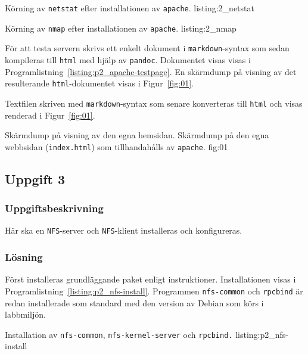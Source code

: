             {Körning av \texttt{netstat} efter installationen av \texttt{apache}.}
            {listing:2_netstat}

            {Körning av \texttt{nmap} efter installationen av \texttt{apache}.}
            {listing:2_nmap}


För att testa servern skrivs ett enkelt dokument i
\texttt{markdown}\cite{Gruber2013}-syntax som sedan kompileras till
\texttt{html} med hjälp av \texttt{pandoc}\cite{MacFarlane2013}.
Dokumentet visas visas i Programlistning~\ref{listing:p2_apache-testpage}.
En skärmdump på visning av det resulterande \texttt{html}-dokumentet visas i
Figur~\ref{fig:01}.

\begin{listing}[H]
\caption{Textfilen skriven med \texttt{markdown}-syntax som senare konverteras
         till \texttt{html} och visas renderad i Figur~\ref{fig:01}.}
\label{listing:p2_apache-testpage}
\end{listing}

           {Skärmdump på visning av den egna hemsidan.}
           {Skärmdump på den egna webbsidan (\texttt{index.html}) som
            tillhandahålls av \texttt{apache}.}
           {fig:01}


\subsection{Uppgift 3}
\subsubsection{Uppgiftsbeskrivning}
Här ska en \texttt{NFS}-server och \texttt{NFS}-klient installeras och
konfigureras.


\subsubsection{Lösning}
Först installeras grundläggande paket enligt instruktioner.
Installationen visas i Programlistning~\ref{listing:p2_nfs-install}.
Programmen \texttt{nfs-common} och \texttt{rpcbind} är redan installerade
som standard med den version av Debian som körs i labbmiljön.

            {Installation av \texttt{nfs-common}, \texttt{nfs-kernel-server}
             och \texttt{rpcbind.}}
            {listing:p2_nfs-install}


